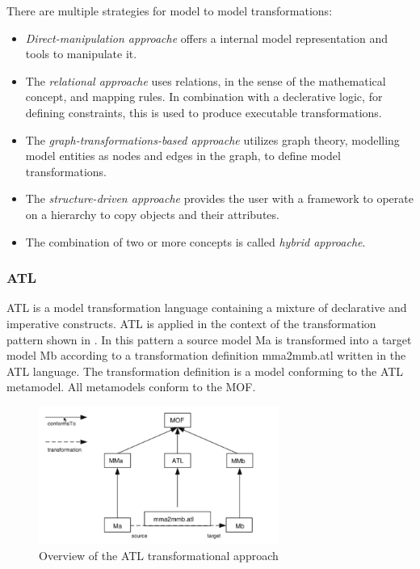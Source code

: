 \documentclass{llncs}
\begin{document}
There are multiple strategies for model to model transformations:

\begin{itemize}
	\item \emph{Direct-manipulation approache} offers a internal model representation and tools to manipulate it.
	\item The \emph{relational approache} uses relations, in the sense of the mathematical concept, and mapping rules. In combination with a declerative logic, for defining constraints, this is used to produce executable transformations.
	\item The \emph{graph-transformations-based approache} utilizes graph theory, modelling model entities as nodes and edges in the graph, to define model transformations.
	\item The \emph{structure-driven approache} provides the user with a framework to operate on a hierarchy to copy objects and their attributes.
	\item The combination of two or more concepts is called \emph{hybrid approache}.
\end{itemize}

\subsubsection{ATL}

ATL is a model transformation language containing a mixture of declarative and
imperative constructs. ATL is applied in the context of the
transformation pattern shown in \label{fig:overview_atl}. In this pattern a source model Ma is transformed into a target model Mb according to a transformation definition mma2mmb.atl written in the ATL language. The transformation definition is a model conforming to the ATL metamodel. All metamodels conform to the MOF.

\begin{figure}
	\centering
	\includegraphics[width=0.7\textwidth,natwidth=610,natheight=642]{figures/Overview_ATL.jpg}
	\caption{Overview of the ATL transformational approach}
	\label{fig:overview_atl}
\end{figure}~\cite{atl:frederic}
\end{document}
